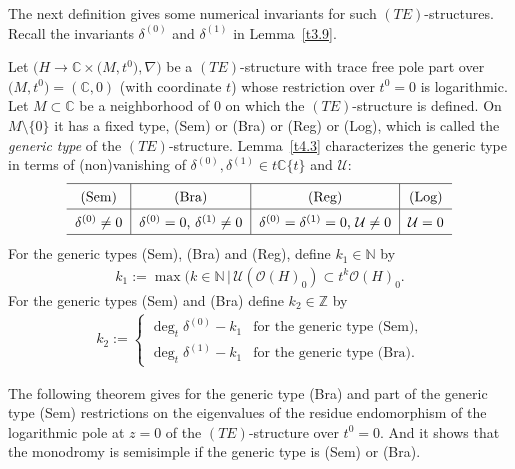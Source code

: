 \documentclass[pdftex]{sigma}%
\numberwithin{equation}{section}
\numberwithin{figure}{section}
\newcommand{\N}{{\mathbb N}}
\newcommand{\Z}{{\mathbb Z}}
\newcommand{\C}{{\mathbb C}}
\newcommand{\OO}{{\mathcal O}}
\newcommand{\UU}{{\mathcal U}}
\newcommand{\nnn}{\nabla}
\begin{document}
The next definition gives some numerical invariants
for such $(TE)$-structures.
Recall the invariants $\delta^{(0)}$ and $\delta^{(1)}$
in Lemma~\ref{t3.9}.


\begin{Definition}\label{t6.1}
Let $\big(H\to\C\times \big(M,t^0\big),\nnn\big)$ be a $(TE)$-structure
with trace free pole part over $\big(M,t^0\big)=(\C,0)$
(with coordinate $t$) whose restriction over $t^0=0$ is
logarithmic. Let $M\subset \C$ be a neighborhood of 0
on which the $(TE)$-structure is defined.
On $M\setminus\{0\}$ it has a fixed type, (Sem) or (Bra) or
(Reg) or (Log), which is called the {\it generic type}
of the $(TE)$-structure. Lemma~\ref{t4.3} characterizes
the generic type in terms of (non)vanishing of
$\delta^{(0)},\delta^{(1)}\in t\C\{t\}$ and $\UU$:
\[
\def\arraystretch{1.5}
\begin{tabular}{c|c|c|c}
\hline
(Sem) &(Bra) &(Reg) &(Log)
\\ \hline
$\delta^{(0)}\neq 0$ & $\delta^{(0)}=0$,\ $\delta^{(1)}\neq 0$ &
$\delta^{(0)}=\delta^{(1)}=0$, $\UU\neq 0$ & $\UU=0$
\\
\hline
\end{tabular}
\]
For the generic types (Sem), (Bra) and (Reg), define
$k_1\in\N$ by
\begin{eqnarray}\label{6.1}
k_1 :=\max(k\in\N\,|\, \UU(\OO(H)_0)\subset t^k\OO(H)_0.
\end{eqnarray}
For the generic types (Sem) and (Bra) define $k_2\in\Z$ by
\begin{gather*}%
k_2:= \begin{cases}
\deg_t\delta^{(0)}-k_1 & \text{for the generic type (Sem)},\\
\deg_t\delta^{(1)}-k_1 & \text{for the generic type (Bra)}.
\end{cases}
\end{gather*}
\end{Definition}

The following theorem gives for the generic type (Bra) and
part of the generic type (Sem) restrictions on the eigenvalues
of the residue endomorphism of the logarithmic pole at $z=0$
of the $(TE)$-structure over $t^0=0$.
And it shows that the monodromy is semisimple if the generic
type is (Sem) or (Bra).
\end{document}
